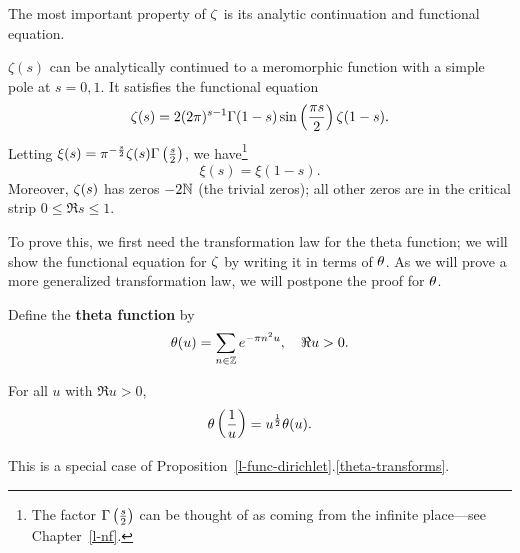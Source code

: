 The most important property of $\zeta$ is its analytic continuation and functional equation.
\begin{thm}
$\zeta(s)$ can be analytically continued to a meromorphic function with a simple pole at $s=0,1$. %
It satisfies the functional equation
\[
\zeta(s)=2(2\pi)^{s-1}\Gamma(1-s)\sin\left( {\frac{\pi s}{2}} \right) \zeta(1-s).
\]
Letting $\xi(s)=\pi^{-\frac s2}\zeta(s)\Gamma\left( {\frac{s}{2}} \right)$, we have\footnote{The factor $\Gamma\left( {\frac{s}{2}} \right)$ can be thought of as coming from the infinite place---see Chapter~\ref{l-nf}.}
\[
\xi(s)=\xi(1-s).
\]
Moreover, $\zeta(s)$ has zeros $-2\mathbb{N}$ (the trivial zeros); all other zeros are in the critical strip $0\le \Re s\le 1$.
\end{thm}
To prove this, we first need the transformation law for the theta function; we will show the functional equation for $\zeta$ by writing it in terms of $\theta$. As we will prove a more generalized transformation law, we will postpone the proof for $\theta$.
\begin{df}
Define the \textbf{theta function} by
\[
\theta(u)=\sum_{n\in \mathbb{Z}}e^{-\pi n^2u},\quad \Re u>0.
\]
\end{df}
\begin{pr}
For all $u$ with $\Re u>0$,
\[
\theta\left( {\frac{1}{u}} \right) = u^{\frac{1}{2}} \theta(u).
\]
\end{pr}
This is a special case of Proposition~\ref{l-func-dirichlet}.\ref{theta-transforms}.
